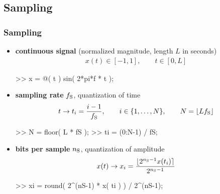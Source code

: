 
\subsection{Sampling}

\begin{frame}[fragile]
	\frametitle{Sampling}
	\begin{itemize}
		\item \textbf{continuous signal} (normalized magnitude, length $L$ in seconds)
			\begin{align*}
				x(t)\in[-1,1],\qquad t\in[0,L]
			\end{align*}
			\begin{code}
>> x = @( t ) sin( 2*pi*f * t ); \color{medium}%
			\end{code}
		\item \textbf{sampling rate} $f_{\textrm S}$, quantization of time
			\begin{align*}
				t\rightarrow t_i=\frac{i-1}{f_{\textrm S}},\qquad i\in\{1,\ldots,N\},\qquad N=\lfloor Lf_{\textrm S}\rfloor
			\end{align*}
			\begin{code}
>> N = floor( L * fS ); \color{medium}%
>> ti = (0:N-1) / fS; \color{medium}%
			\end{code}
		\item \textbf{bits per sample} $n_{\textrm S}$, quantization of amplitude
			\begin{align*}
				x(t)\rightarrow x_i=\frac{\lfloor2^{n_{\textrm S}-1}x(t_i)\rceil}{2^{n_{\textrm S}-1}}
			\end{align*}
			\begin{code}
>> xi = round( 2^(nS-1) * x( ti ) ) / 2^(nS-1); \color{medium}%
			\end{code}
	\end{itemize}
\end{frame}

